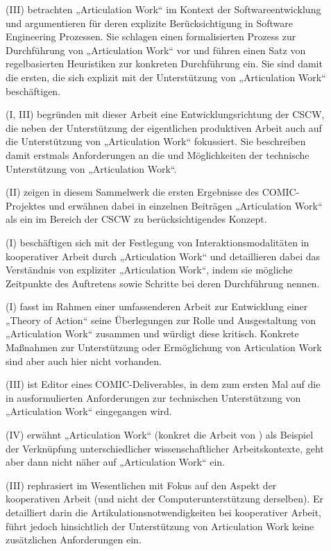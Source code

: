 \begin{description}
	\item[\citet{Mi91}] (III) betrachten „Articulation Work“ im Kontext der Softwareentwicklung und argumentieren für deren explizite Berücksichtigung in Software Engineering Prozessen. Sie schlagen einen formalisierten Prozess zur Durchführung von „Articulation Work“ vor und führen einen Satz von regelbasierten Heuristiken zur konkreten Durchführung ein. Sie sind damit die ersten, die sich explizit mit der Unterstützung von „Articulation Work“ beschäftigen.
	\item[\citet{Schmidt92}] (I, III) begründen mit dieser Arbeit eine Entwicklungsrichtung der \gls{CSCW}, die neben der Unterstützung der eigentlichen produktiven Arbeit auch auf die Unterstützung von „Articulation Work“ fokussiert. Sie beschreiben damit erstmals Anforderungen an die und Möglichkeiten der technische Unterstützung von „Articulation Work“.
	\item[\citet{Bannon93}] (II) zeigen in diesem Sammelwerk die ersten Ergebnisse des COMIC-Projektes \citep{Rodden95} und erwähnen dabei in einzelnen Beiträgen „Articulation Work“ als ein im Bereich der \gls{CSCW} zu berücksichtigendes Konzept.
	\item[\citet{Corbin93}] (I) beschäftigen sich mit der Festlegung von Interaktionsmodalitäten in kooperativer Arbeit durch „Articulation Work“ und detaillieren dabei das Verständnis von expliziter „Articulation Work“, indem sie mögliche Zeitpunkte des Auftretens sowie Schritte bei deren Durchführung nennen.
	\item[\citet{Strauss93}] (I) fasst im Rahmen einer umfassenderen Arbeit zur Entwicklung einer „Theory of Action“ seine Überlegungen zur Rolle und Ausgestaltung von „Articulation Work“ zusammen und würdigt diese kritisch. Konkrete Maßnahmen zur Unterstützung oder Ermöglichung von Articulation Work sind aber auch hier nicht vorhanden.
	\item[\citep{Bowers94}] (III) ist Editor eines COMIC-Deliverables, in dem zum ersten Mal auf die in \citep{Schmidt96} ausformulierten Anforderungen zur technischen Unterstützung von „Articulation Work“ eingegangen wird.
	\item[\citet{Lenoir94}] (IV) erwähnt „Articulation Work“ (konkret die Arbeit von \citet{Fujimura87}) als Beispiel der Verknüpfung unterschiedlicher wissenschaftlicher Arbeitskontexte, geht aber dann nicht näher auf „Articulation Work“ ein.
	\item[\citet{Schmidt94}] (III) rephrasiert im Wesentlichen \citep{Schmidt90} mit Fokus auf den Aspekt der kooperativen Arbeit (und nicht der Computerunterstützung derselben). Er detailliert darin die Artikulationsnotwendigkeiten bei kooperativer Arbeit, führt jedoch hinsichtlich der Unterstützung von Articulation Work keine zusätzlichen Anforderungen ein.

\end{description}
